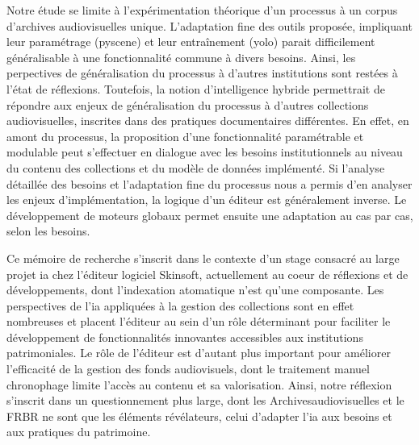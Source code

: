 Notre étude se limite à l'expérimentation théorique d'un processus à un corpus d'archives audiovisuelles unique. L'adaptation fine des outils proposée, impliquant leur paramétrage (\gls{pyscene}) et leur entraînement (\gls{yolo}) parait difficilement généralisable à une fonctionnalité commune à divers besoins. Ainsi, les perpectives de généralisation du processus à d'autres institutions sont restées à l'état de réflexions. Toutefois, la notion d'intelligence hybride permettrait de répondre aux enjeux de généralisation du processus à d'autres collections audiovisuelles, inscrites dans des pratiques documentaires différentes. En effet, en amont du processus, la proposition d'une fonctionnalité paramétrable et modulable peut s'effectuer en dialogue avec les besoins institutionnels au niveau du contenu des collections et du modèle de données implémenté. 
Si l'analyse détaillée des besoins et l'adaptation fine du processus nous a permis d'en analyser les enjeux d'implémentation, la logique d'un éditeur est généralement inverse. Le développement de moteurs globaux permet ensuite une adaptation au cas par cas, selon les besoins.

Ce mémoire de recherche s'inscrit dans le contexte d'un stage consacré au large projet \gls{ia} chez l'éditeur logiciel Skinsoft, actuellement au coeur de réflexions et de développements, dont l'indexation atomatique n'est qu'une composante. Les perspectives de l'\gls{ia} appliquées à la gestion des collections sont en effet nombreuses et placent l'éditeur au sein d'un rôle déterminant pour faciliter le développement de fonctionnalités innovantes accessibles aux institutions patrimoniales. Le rôle de l'éditeur est d'autant plus important pour améliorer l'efficacité de la gestion des fonds audiovisuels, dont le traitement manuel chronophage limite l'accès au contenu et sa valorisation. Ainsi, notre réflexion s'inscrit dans un questionnement plus large, dont les \gls{Archivesaudiovisuelles} et le \gls{FRBR} ne sont que les éléments révélateurs, celui d'adapter l'\gls{ia} aux besoins et aux pratiques du patrimoine.  


%

